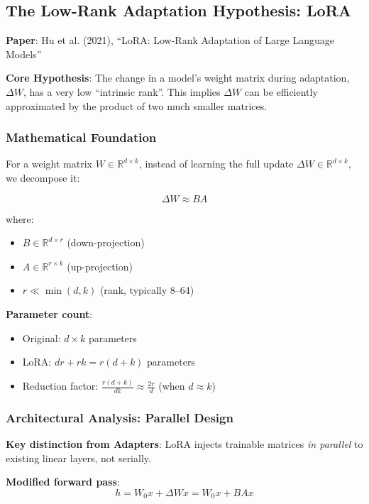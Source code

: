 \documentclass{article}
\begin{document}
\subsection{The Low-Rank Adaptation Hypothesis: LoRA}

\textbf{Paper}: Hu et al. (2021), ``LoRA: Low-Rank Adaptation of Large Language Models''

\textbf{Core Hypothesis}: The change in a model's weight matrix during adaptation, $\Delta W$, has a very low ``intrinsic rank''. This implies $\Delta W$ can be efficiently approximated by the product of two much smaller matrices.

\subsubsection{Mathematical Foundation}

For a weight matrix $W \in \mathbb{R}^{d \times k}$, instead of learning the full update $\Delta W \in \mathbb{R}^{d \times k}$, we decompose it:

\[
\Delta W \approx BA
\]

where:
\begin{itemize}
\item $B \in \mathbb{R}^{d \times r}$ (down-projection)
\item $A \in \mathbb{R}^{r \times k}$ (up-projection)
\item $r \ll \min(d, k)$ (rank, typically 8--64)
\end{itemize}

\textbf{Parameter count}:
\begin{itemize}
\item Original: $d \times k$ parameters
\item LoRA: $dr + rk = r(d + k)$ parameters
\item Reduction factor: $\frac{r(d+k)}{dk} \approx \frac{2r}{d}$ (when $d \approx k$)
\end{itemize}

\subsubsection{Architectural Analysis: Parallel Design}

\textbf{Key distinction from Adapters}: LoRA injects trainable matrices \textit{in parallel} to existing linear layers, not serially.

\textbf{Modified forward pass}:
\[
h = W_0 x + \Delta W x = W_0 x + BAx
\]
\end{document}
